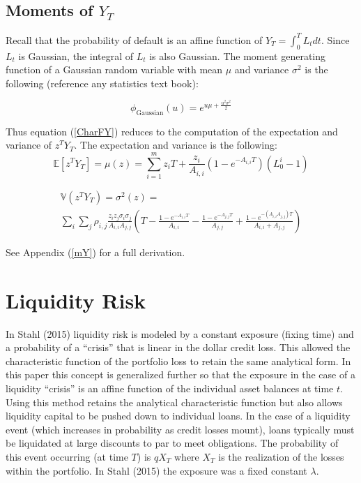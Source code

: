 \documentclass[12pt]{article}
\theoremstyle{definition}
\begin{document}
\subsection{Moments of \(Y_T\)} 

Recall that the probability of default is an affine function of \(Y_T=\int_0^T L_t dt\).  Since \(L_t\) is Gaussian, the integral of \(L_t\) is also Gaussian.  The moment generating function of a Gaussian random variable with mean \(\mu\) and variance \(\sigma^2\) is the following (reference any statistics text book):

\begin{equation}\phi_{\mathrm{Gaussian}}(u)=\label{GaussianMGF} e^{u\mu +\frac{u^2\sigma^2}{2}} \end{equation}

Thus equation (\ref{CharFY}) reduces to the computation of the expectation and variance of \(z^T Y_T\).  The expectation and variance is the following:
\begin{equation} \label{meY} \mathbb{E}[z^T Y_T]=\mu(z)=\sum_{i=1} ^ m z_i T+\frac{z_i}{A_{i,i}}\left(1-e^{-{A}_{i, i}T}\right)(L_0^ i-1)\end{equation}

\begin{multline}\label{varianceY} \mathbb{V}(z^T Y_T)=\sigma^2(z)=\\ \sum_i \sum_j \rho_{i,j} \frac{ z_i z_j \sigma_i \sigma_j}{A_{i,i} A_{j,j}} \left(T-\frac{1-e^{-A_{i,i}T}}{A_{i,i}}-\frac{1-e^{-A_{j,j}T}}{A_{j,j}}+\frac{1-e^{-(A_{i,i}A_{j,j})T}}{A_{i,i}+A_{j,j}}\right) \end{multline}

See Appendix (\ref{mY}) for a full derivation.

\section{Liquidity Risk} \label{riskContributions}
In Stahl (2015) liquidity risk is modeled by a constant exposure (fixing time) and a probability of a ``crisis'' that is linear in the dollar credit loss.  This allowed the characteristic function of the portfolio loss to retain the same analytical form.  In this paper this concept is generalized further so that the exposure in the case of a liquidity ``crisis'' is an affine function of the individual asset balances at time \(t\).  Using this method retains the analytical characteristic function but also allows liquidity capital to be pushed down to individual loans.  In the case of a liquidity event (which increases in probability as credit losses mount), loans typically must be liquidated at large discounts to par to meet obligations.  The probability of this event occurring (at time \(T\)) is \(q X_T\) where \(X_T\) is the realization of the losses within the portfolio.  In Stahl (2015) the exposure was a fixed constant \(\lambda\).  
\end{document}
